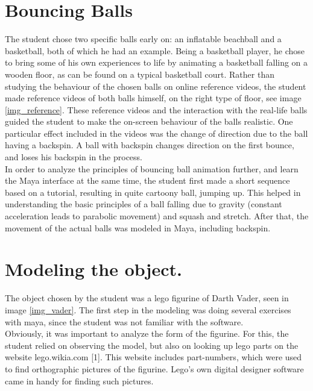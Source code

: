\documentclass[12pt,a4paper]{article}
\begin{document}
\section{Bouncing Balls}

The student chose two specific balls early on: an inflatable beachball and a basketball, both of which he had an example. Being a basketball player, he chose to bring some of his own experiences to life by animating a basketball falling on a wooden floor, as can be found on a typical basketball court. Rather than studying the behaviour of the chosen balls on online reference videos, the student made reference videos of both balls himself, on the right type of floor, see image \ref{img_reference}. These reference videos and the interaction with the real-life balls guided the student to make the on-screen behaviour of the balls realistic. One particular effect included in the videos was the change of direction due to the ball having a backspin. A ball with backspin changes direction on the first bounce, and loses his backspin in the process. \\

In order to analyze the principles of bouncing ball animation further, and learn the Maya interface at the same time, the student first made a short sequence based on a tutorial, resulting in quite cartoony ball, jumping up. This helped in understanding the basic principles of a ball falling due to gravity (constant acceleration leads to parabolic movement) and squash and stretch. After that, the movement of the actual balls was modeled in Maya, including backspin.\\

\section{Modeling the object.}
The object chosen by the student was a lego figurine of Darth Vader, seen in image \ref{img_vader}. The first step in the modeling was doing several exercises with maya, since the student was not familiar with the software.\\

Obviously, it was important to analyze the form of the figurine. For this, the student relied on observing the model, but also on looking up lego parts on the website lego.wikia.com [1]. This website includes part-numbers, which were used to find orthographic pictures of the figurine. Lego's own digital designer software came in handy for finding such pictures.
\end{document}
